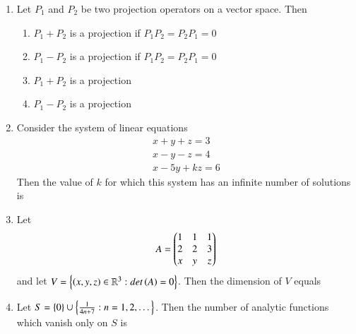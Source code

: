 \documentclass[journal]{IEEEtran}
\begin{document}
\begin{enumerate}
\item Let $P_1$ and $P_2$ be two projection operators on a vector space. Then 
\begin{enumerate}
    \item $P_1+P_2$ is a projection if $P_1 P_2=P_2 P_1=0$
    \item $P_1-P_2$ is a projection if $P_1 P_2=P_2 P_1=0$
    \item $P_1+P_2$ is a projection 
    \item $P_1-P_2$ is a projection 
\end{enumerate}

\item Consider the system of linear equations 
\begin{align*}
    x+y+z=3\\
    x-y-z=4\\
    x-5y+kz=6
\end{align*}
Then the value of $k$ for which this system has an infinite number of solutions is 
\begin{enumerate}
\end{enumerate}

\item Let
\begin{align*}
    A=\begin{pmatrix}1&1&1\\2&2&3\\x&y&z\end{pmatrix}
\end{align*}
and let $V=\left\{\left(x,y,z\right)\in \mathbb R^3: det\left(A\right)=0\right\}$. Then the dimension of $V$ equals
\begin{enumerate}
\end{enumerate}

\item Let $S=\left\{0\right\} \cup \left\{\frac{1}{4n+7}: n=1,2,\dots\right\}$. Then the number of analytic functions which vanish only on $S$ is
\begin{enumerate}
\end{enumerate}


\end{enumerate}
\end{document}
